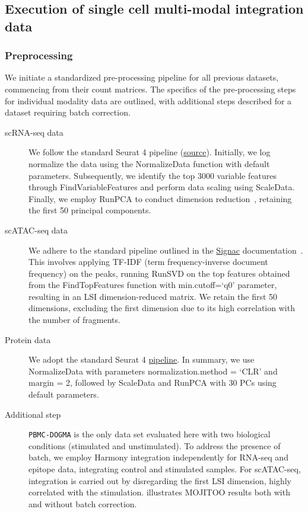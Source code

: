 \subsection{Execution of single cell multi-modal integration data}
\label{MOJITOO:exp:run}

\subsubsection{Preprocessing}
\label{MOJITOO:exp:preprocessing}
We initiate a standardized pre-processing pipeline for all previous datasets, commencing from their count matrices. The specifics of the pre-processing steps for individual modality data are outlined, with additional steps described for a dataset requiring batch correction.
\begin{description}
    \item[scRNA-seq data]
    We follow the standard Seurat 4 pipeline (\href{https://satijalab.org/seurat/articles/pbmc3k_tutorial.html}{source}). Initially, we log normalize the data using the NormalizeData function with default parameters. Subsequently, we identify the top 3000 variable features through FindVariableFeatures and perform data scaling using ScaleData. Finally, we employ RunPCA to conduct dimension reduction~\citep{hao2021integrated}, retaining the first 50 principal components.
    
    \item[scATAC-seq data]
    We adhere to the standard pipeline outlined in the \href{https://satijalab.org/signac/articles/pbmc_vignette.html}{Signac} documentation~\citep{signac}. This involves applying TF-IDF (term frequency-inverse document frequency) on the peaks, running RunSVD on the top features obtained from the FindTopFeatures function with min.cutoff=`q0' parameter, resulting in an LSI dimension-reduced matrix. We retain the first 50 dimensions, excluding the first dimension due to its high correlation with the number of fragments.  
    
    \item[Protein data]
    We adopt the standard Seurat 4 \href{https://satijalab.org/seurat/articles/multimodal_vignette.html}{pipeline}\citep{hao2021integrated}. In summary, we use NormalizeData with parameters normalization.method = `CLR' and margin = 2, followed by ScaleData and RunPCA with 30 PCs using default parameters.
    
    \item[Additional step] 
    \texttt{PBMC-DOGMA} is the only data set evaluated here with two biological conditions (stimulated and unstimulated). To address the presence of batch, we employ Harmony integration\citep{korsunsky2019harmony} independently for RNA-seq and epitope data, integrating control and stimulated samples. For scATAC-seq, integration is carried out by disregarding the first LSI dimension, highly correlated with the stimulation.  illustrates MOJITOO results both with and without batch correction.
\end{description}

